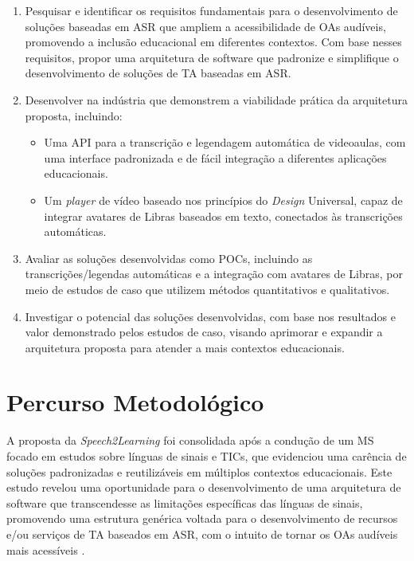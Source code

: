 \begin{enumerate}
\item Pesquisar e identificar os requisitos fundamentais para o desenvolvimento de soluções baseadas em ASR que ampliem a acessibilidade de OAs audíveis, promovendo a inclusão educacional em diferentes contextos. Com base nesses requisitos, propor uma arquitetura de software que padronize e simplifique o desenvolvimento de soluções de TA baseadas em ASR.
\item Desenvolver  na indústria que demonstrem a viabilidade prática da arquitetura proposta, incluindo:
\begin{itemize}
\item Uma API para a transcrição e legendagem automática de videoaulas, com uma interface padronizada e de fácil integração a diferentes aplicações educacionais.
\item Um \textit{player} de vídeo baseado nos princípios do \textit{Design} Universal, capaz de integrar avatares de Libras baseados em texto, conectados às transcrições automáticas.
\end{itemize}
\item Avaliar as soluções desenvolvidas como POCs, incluindo as transcrições/legendas automáticas e a integração com avatares de Libras, por meio de estudos de caso que utilizem métodos quantitativos e qualitativos.
\item Investigar o potencial das soluções desenvolvidas, com base nos resultados e valor demonstrado pelos estudos de caso, visando aprimorar e expandir a arquitetura proposta para atender a mais contextos educacionais.
\end{enumerate}

\section{Percurso Metodológico}
\label{chapter1:methodological-path}

A proposta da \textit{Speech2Learning} foi consolidada após a condução de um MS focado em estudos sobre línguas de sinais e TICs, que evidenciou uma carência de soluções padronizadas e reutilizáveis em múltiplos contextos educacionais. Este estudo revelou uma oportunidade para o desenvolvimento de uma arquitetura de software que transcendesse as limitações específicas das línguas de sinais, promovendo uma estrutura genérica voltada para o desenvolvimento de recursos e/ou serviços de TA baseados em ASR, com o intuito de tornar os OAs audíveis mais acessíveis \cite{FalvoJr2020_FIE, FalvoJr2020_SBIE, FalvoJr2021_RENOTE}.

